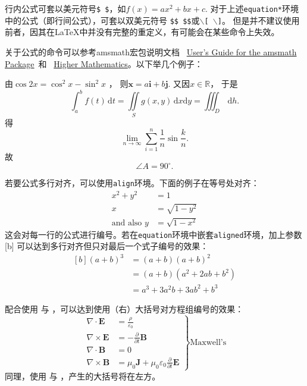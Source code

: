 行内公式可套以美元符号\texttt{\$ \$}，如$f(x)=ax^2+bx+c$.
对于上述\texttt{equation*}环境中的公式（即行间公式），可套以双美元符号
\texttt{\$\$ \quad{}\$\$}或\texttt{$\backslash$[ \quad{}$\backslash$]}。
但是并不建议使用前者，因其在\LaTeX{}中并没有完整的重定义，有可能会在某些命令上失效。

关于公式的命令可以参考\textsf{amsmath}宏包说明文档~
\href{https://mirrors.tuna.tsinghua.edu.cn/CTAN/macros/latex/required/amsmath/amsldoc.pdf}
{User's Guide for the amsmath Package}~和~
\href{http://media.cism.it/attachments/ch8.pdf}{Higher Mathematics}。以下举几个例子：

由$\cos 2x=\cos^2x-\sin^2x$ ，		%
则$\boldsymbol{x}=a\bm{i}+b\bm{j}.$	%
又因$x\in \mathbb{R} $，			%
于是
\[
	\int_a^b f(t)\,\mathrm{d}t = \iint\limits_S g(x,y)\,\mathrm{d}x\mathrm{d}y
	= \iiint\nolimits_D\, \mathrm{d}h.	%
\]
得
$$\lim_{n \to \infty}\sum_{i=1}^n{\frac{1}{n}}\sin\frac{k}{n}.$$	%
故
\begin{equation}\label{eq:quadratic}
	\angle A = 90^\circ.			%
\end{equation}

若要公式多行对齐，可以使用\texttt{align}环境。下面的例子在等号处对齐：
\begin{align}
	x^2 + y^2 & = 1            \\
	x         & = \sqrt{1-y^2} \\\text{and also }
	y         & =\sqrt{1-x^2}
\end{align}
这会对每一行的公式进行编号。若在\texttt{equation}环境中嵌套\texttt{aligned}环境，加上参数[b]
可以达到多行对齐但只对最后一个式子编号的效果：
\begin{equation}
	\begin{aligned}[b]
		(a + b)^3   & = (a + b) (a + b)^2         \\
					& = (a + b)(a^2 + 2ab + b^2)  \\
					& = a^3 + 3a^2b + 3ab^2 + b^3
	\end{aligned}
\end{equation}

配合使用  与 \cmd{\}}，可以达到使用（右）大括号对方程组编号的效果：
\begin{equation}\left.
	\begin{aligned}
		\nabla  \cdot \mathbf{E} & = \frac{\rho }{\varepsilon _0}                                             \\
		\nabla \times \mathbf{E} & = -\frac{\partial}{\partial t}\mathbf{B}                                   \\
		\nabla  \cdot \mathbf{B} & = 0                                                                        \\
		\nabla \times \mathbf{B} & = \mu_0\mathbf{J}+\mu_0\varepsilon _0\frac{\partial}{\partial t}\mathbf{E}
	\end{aligned} \right\}\text{Maxwell's}
\end{equation}
同理，使用 \cmd{\}} 与 ，产生的大括号将在左方。

